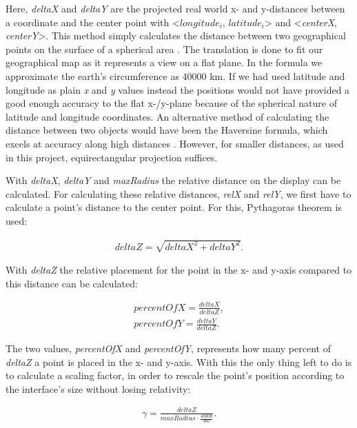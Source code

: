 Here, \textit{deltaX} and \textit{deltaY} are the projected real world x- and y-distances between a coordinate and the center point with <$longitude_i$, $latitude_i$> and <\textit{centerX}, \textit{centerY}>. This method simply calculates the distance between two geographical points on the surface of a spherical area \cite{equi}. The translation is done to fit our geographical map as it represents a view on a flat plane. In the formula we approximate the earth's circumference as 40000 km. If we had used latitude and longitude as plain \textit{x} and \textit{y} values instead the positions would not have provided a good enough accuracy to the flat x-/y-plane because of the spherical nature of latitude and longitude coordinates. An alternative method of calculating the distance between two objects would have been the Haversine formula, which excels at accuracy along high distances \cite{haversine}. However, for smaller distances, as used in this project, equirectangular projection suffices.

With \textit{deltaX}, \textit{deltaY} and \textit{maxRadius} the relative distance on the display can be calculated. For calculating these relative distances, \textit{relX} and \textit{relY}, 
we first have to calculate a point's distance to the center point. For this, Pythagoras theorem is used:

\begin{align}
\label{eq:deltaZ}
deltaZ = \sqrt{deltaX^2 + deltaY^2}.
\end{align}

With \textit{deltaZ} the relative placement for the point in the x- and y-axis compared to this distance can be calculated:

\begin{align}
\label{eq:percent}
percentOfX = \frac{deltaX}{deltaZ}, \\
percentOfY = \frac{deltaY}{deltaZ}. \nonumber
\end{align}

The two values,  \textit{percentOfX} and \textit{percentOfY},  represents how many percent of \textit{deltaZ} a point is placed in the x- and y-axis. With this the only thing left to do is to calculate a scaling factor, in order to rescale the point's position according to the interface's size without losing relativity: 

\begin{align}
\label{eq:scalingFactor}
\gamma = \frac{deltaZ}{maxRadius \cdot \frac{40000}{360}}.
\end{align}

